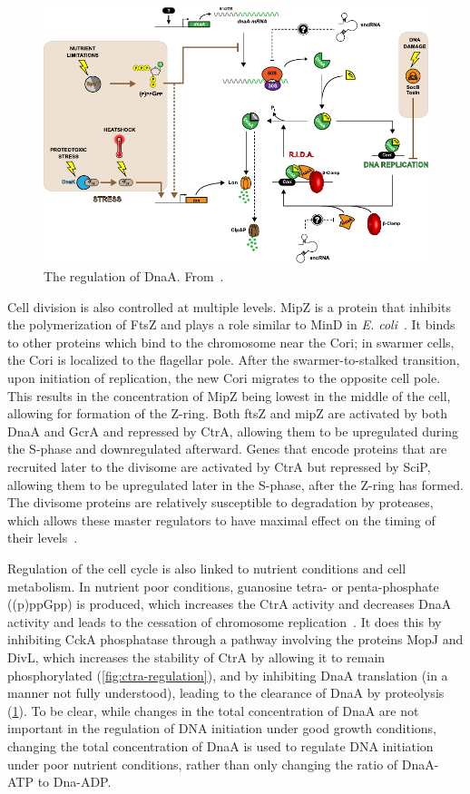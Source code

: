 \begin{figure}
    \centering
    \includegraphics{dnaa-regulation}
    \caption{
        The regulation of DnaA.
        From~\cite{frandi2019}.
        \label{fig:dnaa-regulation}
     }
\end{figure}

Cell division is also controlled at multiple levels.
MipZ is a protein that inhibits the polymerization of FtsZ and plays a role similar to MinD in \textit{E. coli}~\cite{collier2019}.
It binds to other proteins which bind to the chromosome near the Cori; in swarmer cells, the Cori is localized to the flagellar pole.
After the swarmer-to-stalked transition, upon initiation of replication, the new Cori migrates to the opposite cell pole.
This results in the concentration of MipZ being lowest in the middle of the cell, allowing for formation of the Z-ring.
Both ftsZ and mipZ are activated by both DnaA and GcrA and repressed by CtrA, allowing them to be upregulated during the S-phase and downregulated afterward.
Genes that encode proteins that are recruited later to the divisome are activated by CtrA but repressed by SciP, allowing them to be upregulated later in the S-phase, after the Z-ring has formed.
The divisome proteins are relatively susceptible to degradation by proteases, which allows these master regulators to have maximal effect on the timing of their levels~\cite{collier2019}.

Regulation of the cell cycle is also linked to nutrient conditions and cell metabolism.
In nutrient poor conditions, guanosine tetra- or penta-phosphate ((p)ppGpp) is produced, which increases the CtrA activity and decreases DnaA activity and leads to the cessation of chromosome replication~\cite{frandi2019}.
It does this by inhibiting CckA phosphatase through a pathway involving the proteins MopJ and DivL, which increases the stability of CtrA by allowing it to remain phosphorylated (\cref{fig:ctra-regulation}), and by inhibiting DnaA translation (in a manner not fully understood), leading to the clearance of DnaA by proteolysis (\cref{fig:dnaa-regulation}).
To be clear, while changes in the total concentration of DnaA are not important in the regulation of DNA initiation under good growth conditions, changing the total concentration of DnaA is used to regulate DNA initiation under poor nutrient conditions, rather than only changing the ratio of DnaA-ATP to Dna-ADP.

